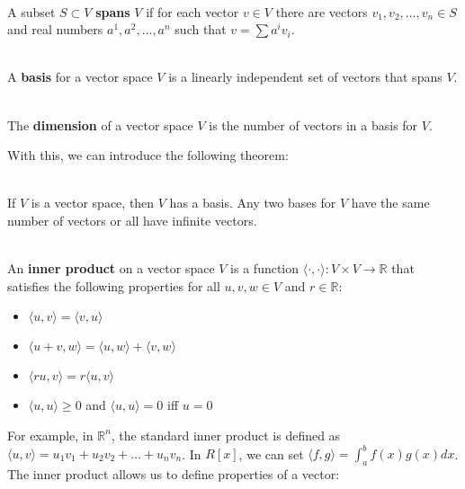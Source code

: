 \documentclass{article}
\newcommand{\bb}[1]{\mathbb{#1}}
\begin{document}
\begin{definition} [Span] \ \\
  A subset $S \subset V$ \textbf{spans} $V$ if for each vector $v \in V$
  there are vectors $v_1, v_2, \dots, v_n \in S$ and real numbers $a^1, a^2, \dots, a^n$
  such that $v = \sum a^i v_i$.
\end{definition}

\begin{definition} [Basis] \ \\
  A \textbf{basis} for a vector space $V$ is a linearly independent set
  of vectors that spans $V$.
\end{definition}

\begin{definition} [Dimension] \ \\
  The \textbf{dimension} of a vector space $V$ is the number of vectors in a basis for $V$.
\end{definition}

With this, we can introduce the following theorem:

\begin{theorem} \ \\
  If $V$ is a vector space, then $V$ has a basis.
  Any two bases for $V$ have the same number of vectors or all have infinite vectors.
\end{theorem}

\begin{definition}  \ \\
  An \textbf{inner product} on a vector space $V$ is a function
  $\langle \cdot, \cdot \rangle : V \times V \rightarrow \bb{R}$
  that satisfies the following properties for all $u, v, w \in V$ and $r \in \bb{R}$:
  \begin{itemize}
    \item $\langle u, v \rangle = \langle v, u \rangle$
    \item $\langle u + v, w \rangle = \langle u, w \rangle + \langle v, w \rangle$
    \item $\langle ru, v \rangle = r \langle u, v \rangle$
    \item $\langle u, u \rangle \ge 0$ and $\langle u, u \rangle = 0$ iff $u = 0$
  \end{itemize}
\end{definition}

For example, in $\bb{R}^n$, the standard inner product is defined as $\langle u, v \rangle = u_1 v_1 + u_2 v_2 + \dots + u_n v_n$.
In $R[x]$, we can set $\langle f, g \rangle = \int_{a}^{b} f(x)g(x)dx$.
The inner product allows us to define properties of a vector:
\end{document}
